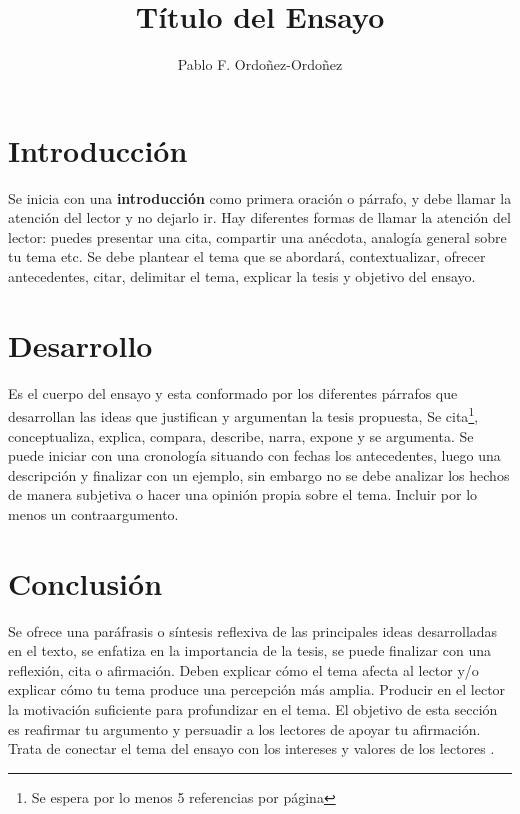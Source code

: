\documentclass[a4paper,12pt]{article}
\title{Título del Ensayo}
\author[1]{
  Pablo F. Ordoñez-Ordoñez \orcid{0000-0001-8079-7694} 
}
\affil[1]{Universidad Nacional de Loja, Ecuador, Facultad de Energía, CIS, Análisis y Diseño de Sistemas, profesor \href{mailto:pfordonez@unl.edu.ec}{pfordonez@unl.edu.ec}}
\begin{document}
\maketitle

\section{Introducción}

Se inicia con una \textbf{introducción} como primera oración o párrafo, y debe llamar la atención del lector y no dejarlo ir. Hay diferentes formas de llamar la atención del lector: puedes presentar una cita,  compartir una anécdota, analogía general sobre tu tema etc. Se debe plantear el tema que se abordará, contextualizar, ofrecer antecedentes, citar, delimitar el tema, explicar la tesis y objetivo del ensayo.

\section{Desarrollo}
Es el cuerpo del ensayo y esta conformado por los diferentes párrafos que desarrollan las ideas que justifican y argumentan la tesis propuesta, Se cita\footnote{Se espera por lo menos 5 referencias por página}, conceptualiza, explica, compara, describe, narra, expone y se argumenta. Se puede iniciar con una cronología situando con fechas los antecedentes, luego una descripción y finalizar con un ejemplo, sin embargo no se debe analizar los hechos de manera subjetiva o hacer una opinión propia sobre el tema. Incluir por lo menos un contraargumento. 

\section{Conclusión}
Se ofrece una paráfrasis o síntesis reflexiva de las principales ideas desarrolladas en el texto, se enfatiza en la importancia de la tesis, se puede finalizar con una reflexión, cita o afirmación. Deben explicar cómo el tema afecta al lector y/o explicar cómo tu tema produce una percepción más amplia. Producir en el lector la motivación suficiente para profundizar en el tema. El objetivo de esta sección es reafirmar tu argumento y persuadir a los lectores de apoyar tu afirmación. Trata de conectar el tema del ensayo con los intereses y valores de los lectores \cite{youArg} \cite{web1}.


\medskip


\end{document}
